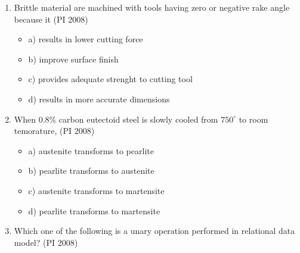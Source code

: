 \documentclass[journal,12pt,onecolumn]{IEEEtran}
\theoremstyle{remark}
\begin{document}
\begin{enumerate}
\item %
Brittle material are machined with tools having zero or negative rake angle because it  
    \hfill{(PI 2008)}

\begin{itemize}[label={}]
        \item a) results in lower cutting force  
        \item b) improve surface finish
        \item c) provides adequate strenght to cutting tool
        \item d) results in more accurate dimensions 
    \end{itemize}
\vspace{1cm}

\item %
When 0.8\% carbon eutectoid steel is slowly cooled from $750^{\circ}$ to room temorature,
    \hfill{(PI 2008)}

\begin{itemize}[label={}]
        \item a) austenite transforms to pearlite
        \item b) pearlite transforms to austenite
        \item c) austenite transforms to martensite  
        \item d) pearlite transforms to martensite
    \end{itemize}
\vspace{1cm}
\item %
Which one of the following is a unary operation performed in relational data model?
    \hfill{(PI 2008)}


\end{enumerate}
\end{document}
